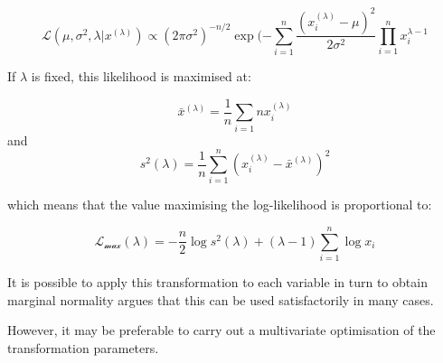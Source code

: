 
\begin{equation}
\mathscr{L}(\mu, \sigma^{2}, \lambda | x^{(\lambda)}) \propto (2 \pi \sigma^{2})^{-n/2} 
\exp(-\sum_{i=1}^{n} \frac{(x_{i}^{(\lambda)} - \mu)^{2}}{2 \sigma^{2}}
\prod_{i=1}^{n}x_{i}^{\lambda-1}
\end{equation}


If $\lambda$ is fixed, this likelihood is maximised at:

\begin{equation}
\bar{x}^{(\lambda)} = \frac{1}{n} \sum_{i=1}{n} x_{i}^{(\lambda)}
\end{equation}
and 
\begin{equation}
s^{2}(\lambda) = \frac{1}{n} \sum_{i=1}^{n}(x_{i}^{(\lambda)} - \bar{x}^{(\lambda)})^{2}
\end{equation}

which means that the value maximising the log-likelihood is proportional to:

\begin{equation}
\mathscr{L_{max}}(\lambda) = -\frac{n}{2} \log s^{2}(\lambda) + (\lambda - 1) \sum_{i=1}^{n} \log x_{i}
\end{equation}

It is possible to apply this transformation to each variable in turn to obtain marginal normality
\cite{Gnanadesikan:1977} argues that this can be used satisfactorily in many cases.

However, it may be preferable to carry out a multivariate optimisation of the transformation parameters.